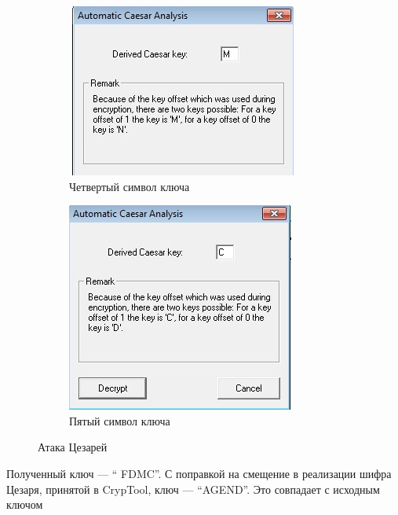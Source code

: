 \documentclass[a4paper, 14pt]{extarticle}
\begin{document}
\begin{enumerate}
\begin{itemize}
\begin{figure}[h]
\begin{subfigure}[b]{0.3\textwidth}
        	\includegraphics[width=\textwidth]{img/S016.jpg}
        	\caption{Четвертый символ ключа}
        \end{subfigure}%
        \hspace{0.5cm}
        \begin{subfigure}[b]{0.3\textwidth}
        	\includegraphics[width=\textwidth]{img/S017.jpg}
        	\caption{Пятый символ ключа}
        \end{subfigure}
        \caption{Атака Цезарей}%
        \label{img:3:5}
    \end{figure}
    
    Полученный ключ --- `` FDMC''. С поправкой на смещение в реализации шифра Цезаря, принятой в CrypTool, ключ --- ``AGEND''. Это совпадает с исходным ключом

    \end{itemize}
\end{enumerate}
\end{document}
